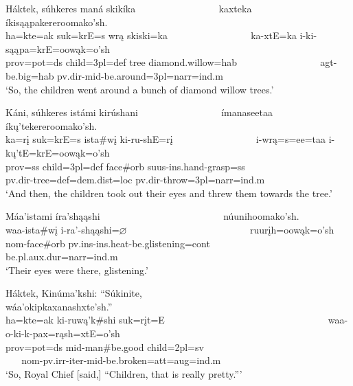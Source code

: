 \begin{exe}
\item\label{EJ15} \glll Háktek, súhkeres maná skikíka ~ ~ ~ ~ ~ ~ ~ ~ ~ ~ kaxteka íkisąąpakereroomako'sh.\\
ha=kte=ak suk=krE=s wrą skiski=ka ~ ~ ~ ~ ~ ~ ~ ~ ~ ~ ka-xtE=ka i-ki-sąąpa=krE=oowąk=o'sh\\
prov=pot=ds \textnormal{child}=3pl=def \textnormal{tree} \textnormal{diamond.willow}=hab ~ ~ ~ ~ ~ ~ ~ ~ ~ ~ agt-\textnormal{be.big}=hab pv.dir-mid-\textnormal{be.around}=3pl=narr=ind.m\\
\glt `So, the children went around a bunch of diamond willow trees.'

\item\label{EJ16} \glll Káni, súhkeres istámi kirúshani ~ ~ ~ ~ ~ ~ ~ ~ ~ ~ ímanaseetaa íkų'tekereroomako'sh.\\
ka=rį suk=krE=s ista\#wį ki-ru-shE=rį ~ ~ ~ ~ ~ ~ ~ ~ ~ ~ i-wrą=s=ee=taa i-kų'tE=krE=oowąk=o'sh\\
prov=ss \textnormal{child}=3pl=def \textnormal{face}\#\textnormal{orb} suus-ins.hand-\textnormal{grasp}=ss ~ ~ ~ ~ ~ ~ ~ ~ ~ ~ pv.dir-\textnormal{tree}=def=dem.dist=loc pv.dir-\textnormal{throw}=3pl=narr=ind.m\\
\glt `And then, the children took out their eyes and threw them towards the tree.'

\item\label{EJ17} \glll Máa'istami íra'shąąshi ~ ~ ~ ~ ~ ~ ~ ~ ~ ~ ~ ~ ~ ~ ~ núunihoomako'sh.\\
waa-ista\#wį i-ra'-shąąshi=$\varnothing$ ~ ~ ~ ~ ~ ~ ~ ~ ~ ~ ~ ~ ~ ~ ~ ruurįh=oowąk=o'sh\\
nom-\textnormal{face}\#\textnormal{orb} pv.ins-ins.heat-\textnormal{be.glistening}=cont ~ ~ ~ ~ ~ ~ ~ ~ ~ ~ ~ ~ ~ ~ ~ \textnormal{be}.pl.aux.dur=narr=ind.m\\
\glt `Their eyes were there, glistening.'

\item\label{EJ18} \glll Háktek, Kinúma'kshi: ``Súkinite, ~ ~ ~ ~ ~ ~ ~ ~ ~ ~ ~ ~ ~ ~ ~ ~ ~ ~ ~ ~ wáa'okipkaxanashxte'sh.''\\
ha=kte=ak ki-ruwą'k\#shi suk=rįt=E ~ ~ ~ ~ ~ ~ ~ ~ ~ ~ ~ ~ ~ ~ ~ ~ ~ ~ ~ ~ waa-o-ki-k-pax=rąsh=xtE=o'sh\\
prov=pot=ds mid-\textnormal{man}\#\textnormal{be.good} \textnormal{child}=2pl=sv ~ ~ ~ ~ ~ ~ ~ ~ ~ ~ ~ ~ ~ ~ ~ ~ ~ ~ ~ ~ nom-pv.irr-iter-mid-\textnormal{be.broken}=att=aug=ind.m\\
\glt `So, Royal Chief [said,] ``Children, that is really pretty.{''}'


\end{exe}
